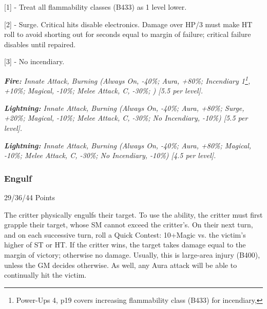 \begin{multicols*}{3}
	\begin{center} 
		\begin{adjustwidth}{-0mm}{}
		\end{adjustwidth}
	\end{center}
	
	[1] - Treat all flammability classes (B433) as 1 level lower.
	
	[2] - Surge. Critical hits disable electronics. Damage over HP/3 must make HT roll to avoid shorting out for seconds equal to margin of failure; critical failure disables until repaired.
	
	[3] - No incendiary.
	
	\textcolor{OliveGreen}{\textit{\textbf{Fire:} Innate Attack, Burning (Always On, -40\%; Aura, +80\%; Incendiary 1\footnote{Power-Ups 4, p19 covers increasing flammability class (B433) for incendiary,}, +10\%; Magical, -10\%; Melee Attack, C, -30\%; ) [5.5 per level].}}
	
	\textcolor{OliveGreen}{\textit{\textbf{Lightning:} Innate Attack, Burning (Always On, -40\%; Aura, +80\%; Surge, +20\%; Magical, -10\%; Melee Attack, C, -30\%; No Incendiary, -10\%) [5.5 per level].}}
	
	\textcolor{OliveGreen}{\textit{\textbf{Lightning:} Innate Attack, Burning (Always On, -40\%; Aura, +80\%; Magical, -10\%; Melee Attack, C, -30\%; No Incendiary, -10\%) [4.5 per level].}}
	
	
	\subsubsection{Engulf}\label{engulf}
	\begin{flushright}
		29/36/44 Points
	\end{flushright}
	
	The critter physically engulfs their target. To use the ability, the critter must first grapple their target, whose SM cannot exceed the critter's. On their next turn, and on each successive turn, roll a Quick Contest: 10+Magic vs. the victim's higher of ST or HT. If the critter wins, the target takes damage equal to the margin of victory; otherwise no damage. Usually, this is large-area injury (B400), unless the GM decides otherwise. As well, any Aura attack will be able to continually hit the victim.
	

\end{multicols*}
